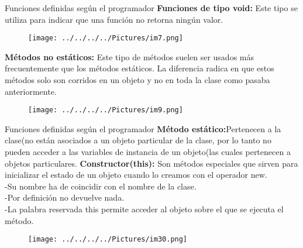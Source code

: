 \documentclass[11pt]{beamer}
\begin{document}
		\begin{frame}{Funciones definidas según el programador}
			\justifying
\textbf{Funciones de tipo void:} Este tipo se utiliza para                                          indicar que una función no retorna ningún valor.
\begin{figure}[hbtp]
		\centering
		\texttt{[image: ../../../../Pictures/im7.png]}
		\end{figure}

		\textbf{Métodos no estáticos: } Este tipo de métodos suelen ser usados más frecuentemente que los métodos estáticos.
La diferencia radica en que estos métodos solo son corridos en un objeto y no en toda la clase como pasaba anteriormente.
		\begin{figure}[hbtp]
		\centering
		\texttt{[image: ../../../../Pictures/im9.png]}
		\end{figure}
\end{frame}
\begin{frame}{Funciones definidas según el programador
}
			\justifying
		\textbf{Método estático:}Pertenecen a la clase(no están asociados a un objeto particular de la clase, por lo tanto no pueden acceder a las variables de instancia de un objeto(las cuales pertenecen a objetos particulares.
		\vfill \textbf{Constructor(this):} Son métodos especiales que sirven para inicializar el estado de un objeto cuando lo creamos con el operador new.\\ \vfill -Su nombre ha de coincidir con el nombre de la clase. \\
		\vfill -Por definición no devuelve nada.\\
		\vfill -La palabra reservada this permite acceder al objeto sobre el que se ejecuta el método.\\
\begin{figure}[H]
				\centering
				\texttt{[image: ../../../../Pictures/im30.png]}
			\end{figure}
		\end{frame}
		
	
	
\end{document}
